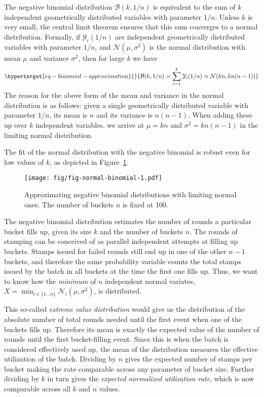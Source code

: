 The negative binomial distribution $\mathcal{B}(k, 1/n)$ is equivalent
to the sum of $k$ independent geometrically distributed variables with
parameter $1/n$. Unless $k$ is very small, the central limit theorem
ensures that this sum converges to a normal distribution. Formally, if
$\mathcal{Y}_i(1/n)$ are independent geometrically distributed
variables with parameter $1/n$, and $\mathcal{N}(\mu, \sigma^2)$ is
the normal distribution with mean $\mu$ and variance $\sigma^2$,
then for large $k$ we have
\begin{equation}\protect\hypertarget{eq-binomial-approximation}{}{
\mathcal{B}(k, 1/n) = \sum_{i=1}^k \mathcal{Y}_i(1/n) \approx \mathcal{N}(kn, kn(n-1))
}\label{eq-binomial-approximation}\end{equation} The reason for the
above form of the mean and variance in the normal distribution is as
follows: given a single geometrically distributed variable with
parameter $1/n$, its mean is $n$ and its variance is $n(n-1)$.
When adding these up over $k$ independent variables, we arrive at
$\mu = k n$ and $\sigma^2 = k n (n - 1)$ in the limiting normal
distribution.

The fit of the normal distribution with the negative binomial is robust even for
low values of $k$, as depicted in Figure~\ref{fig-normal-binomial}.

\begin{figure}
  \centering
  \texttt{[image: fig/fig-normal-binomial-1.pdf]}
  \caption[Approximating negative binomial]{\label{fig-normal-binomial}Approximating negative binomial distributions with limiting normal ones. The number of buckets $n$ is fixed at 100.}
\end{figure}

The negative binomial distribution estimates the number of rounds a
particular bucket fills up, given its size $k$ and the number of
buckets $n$. The rounds of stamping can be conceived of as parallel
independent attempts at filling up buckets. Stamps issued for failed
rounds still end up in one of the other $n - 1$ buckets, and therefore
the same probability variable counts the total stamps issued by the
batch in all buckets at the time the first one fills up. Thus, we want
to know how the \emph{minimum} of $n$ independent normal variates,
$X = \min_{i \in \{1\ldots n\}} \mathcal{N}_i(\mu, \sigma^2)$, is
distributed.

This so-called \emph{extreme value distribution} would give us the
distribution of the absolute number of total rounds needed until the
first event when one of the buckets fills up. Therefore its mean is
exactly the expected value of the number of rounds until the first
bucket-filling event. Since this is when the batch is considered
effectively used up, the mean of the distribution measures the effective
utilization of the batch. Dividing by $n$ gives the expected number of
stamps per bucket making the rate comparable across any parameter of
bucket size. Further dividing by $k$ in turn gives the \emph{expected
normalized utilization rate}, which is now comparable across all $k$
and $n$ values.

